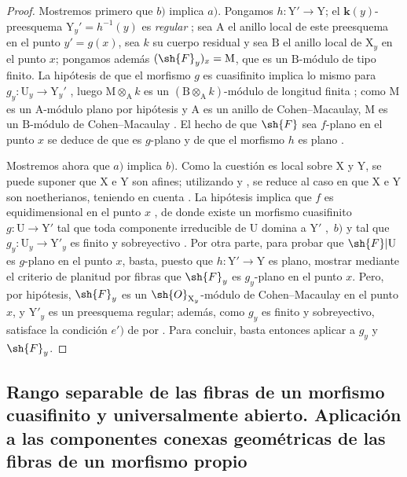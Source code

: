 \begin{proof}
\label{IV.15.4.3-proof}
Mostremos primero que $b)$ implica $a)$.
Pongamos $h:\mathrm{Y}'\to\mathrm{Y}$; el $\boldsymbol{k}(y)$-preesquema $\mathrm{Y}_y'=h^{-1}(y)$ es \emph{regular} ; sea $\mathrm{A}$ el anillo local de este preesquema en el punto $y'=g(x)$, sea $k$ su cuerpo residual y sea $\mathrm{B}$ el anillo local de $\mathrm{X}_y$ en el punto $x$; pongamos además $(\sh{F}_y)_x=\mathrm{M}$, que es un $\mathrm{B}$-módulo de tipo finito.
La hipótesis de que el morfismo $g$ es cuasifinito implica lo mismo para $g_y:\mathrm{U}_y\to\mathrm{Y}_y'$ , luego $\mathrm{M}\otimes_\mathrm{A} k$ es un $(\mathrm{B}\otimes_\mathrm{A} k)$-módulo de longitud finita ; como $\mathrm{M}$ es un $\mathrm{A}$-módulo plano por hipótesis y $\mathrm{A}$ es un anillo de Cohen--Macaulay, $\mathrm{M}$ es un $\mathrm{B}$-módulo de Cohen--Macaulay .
El hecho de que $\sh{F}$ sea $f$-plano en el punto $x$ se deduce de que es $g$-plano y de que el morfismo $h$ es plano .

Mostremos ahora que $a)$ implica $b)$.
Como la cuestión es local sobre $\mathrm{X}$ y $\mathrm{Y}$, se puede suponer que $\mathrm{X}$ e $\mathrm{Y}$ son afines; utilizando  y , se reduce al caso en que $\mathrm{X}$ e $\mathrm{Y}$ son noetherianos, teniendo en cuenta .
La hipótesis implica que $f$ es equidimensional en el punto $x$ , de donde existe un morfismo cuasifinito $g:\mathrm{U}\to\mathrm{Y}'$ tal que toda componente irreducible de $\mathrm{U}$ domina a $\mathrm{Y}'$ ,~$b)$ y tal que $g_y:\mathrm{U}_y\to\mathrm{Y}'_y$ es finito y sobreyectivo .
Por otra parte, para probar que $\sh{F}|\mathrm{U}$ es $g$-plano en el punto $x$, basta, puesto que $h:\mathrm{Y}'\to\mathrm{Y}$ es plano, mostrar mediante el criterio de planitud por fibras  que $\sh{F}_y$ es $g_y$-plano en el punto $x$.
Pero, por hipótesis, $\sh{F}_y$ es un $\sh{O}_{\mathrm{X}_y}$-módulo de Cohen--Macaulay en el punto $x$, y $\mathrm{Y}'_y$ es un preesquema regular; además, como $g_y$ es finito y sobreyectivo, satisface la condición $e')$ de  por .
Para concluir, basta entonces aplicar  a $g_y$ y $\sh{F}_y$.
\end{proof}
\subsection{Rango separable de las fibras de un morfismo cuasifinito y universalmente abierto. Aplicación a las componentes conexas geométricas de las fibras de un morfismo propio}
\label{subsection:IV.15.5}

